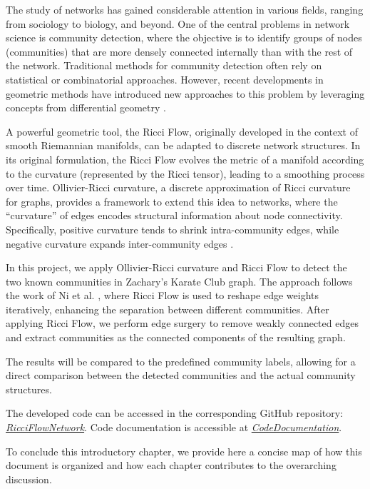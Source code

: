 The study of networks has gained considerable attention in various fields, ranging from sociology to biology, and beyond. One of the central problems in network science is community detection, where the objective is to identify groups of nodes (communities) that are more densely connected internally than with the rest of the network. Traditional methods for community detection often rely on statistical or combinatorial approaches. However, recent developments in geometric methods have introduced new approaches to this problem by leveraging concepts from differential geometry \cite{Ni:communitydetectionnetworksricci}.

A powerful geometric tool, the Ricci Flow, originally developed in the context of smooth Riemannian manifolds, can be adapted to discrete network structures. In its original formulation, the Ricci Flow evolves the metric of a manifold according to the curvature (represented by the Ricci tensor), leading to a smoothing process over time. Ollivier-Ricci curvature, a discrete approximation of Ricci curvature for graphs, provides a framework to extend this idea to networks, where the “curvature” of edges encodes structural information about node connectivity. Specifically, positive curvature tends to shrink intra-community edges, while negative curvature expands inter-community edges \cite{Ni:communitydetectionnetworksricci}.

In this project, we apply Ollivier-Ricci curvature and Ricci Flow to detect the two known communities in Zachary's Karate Club graph. The approach follows the work of Ni et al. \cite{Ni:communitydetectionnetworksricci}, where Ricci Flow is used to reshape edge weights iteratively, enhancing the separation between different communities. After applying Ricci Flow, we perform edge surgery to remove weakly connected edges and extract communities as the connected components of the resulting graph.

The results will be compared to the predefined community labels, allowing for a direct comparison between the detected communities and the actual community structures. 

The developed code can be accessed in the corresponding GitHub repository: \textit{\href{https://github.com/fabbri-lorenzo/RicciFlowNetwork}{RicciFlowNetwork}}.
Code documentation is accessible at \textit{\href{https://fabbri-lorenzo.github.io/RicciFlowNetwork/}{CodeDocumentation}}.

To conclude this introductory chapter, we provide here a concise map of how this document is organized and how each chapter contributes to the overarching discussion.

